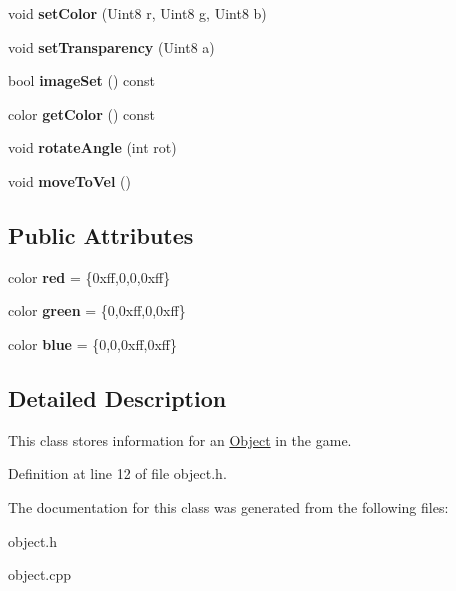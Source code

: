 \begin{DoxyCompactItemize}
\mbox{\label{classObject_a3edcc3118a41df3a46a096b23823f37e}} 
void {\bfseries set\+Color} (Uint8 r, Uint8 g, Uint8 b)
\item 
\mbox{\label{classObject_aa07a7c992ab59f6c1ee929e03fa2c2ea}} 
void {\bfseries set\+Transparency} (Uint8 a)
\item 
\mbox{\label{classObject_a249aa78f8e46de74ef3bc34461cec605}} 
bool {\bfseries image\+Set} () const
\item 
\mbox{\label{classObject_a62f952b12e33b13d3d7bbf09291aed47}} 
color {\bfseries get\+Color} () const
\item 
\mbox{\label{classObject_aea24881ca647d6ccf7d89fd2735c1969}} 
void {\bfseries rotate\+Angle} (int rot)
\item 
\mbox{\label{classObject_acb93016fa37730252cf35fa282e5a3c3}} 
void {\bfseries move\+To\+Vel} ()
\end{DoxyCompactItemize}
\subsection*{Public Attributes}
\begin{DoxyCompactItemize}
\item 
\mbox{\label{classObject_af614f0ca72ca572b74886552bb8aa19b}} 
color {\bfseries red} = \{0xff,0,0,0xff\}
\item 
\mbox{\label{classObject_a8f5119ace90c47b3d20d19b41027f85c}} 
color {\bfseries green} = \{0,0xff,0,0xff\}
\item 
\mbox{\label{classObject_a4bfc5def477cc3d742b571d65f043fa4}} 
color {\bfseries blue} = \{0,0,0xff,0xff\}
\end{DoxyCompactItemize}


\subsection{Detailed Description}
This class stores information for an \hyperlink{classObject}{Object} in the game. 

Definition at line 12 of file object.\+h.



The documentation for this class was generated from the following files\+:\begin{DoxyCompactItemize}
\item 
object.\+h\item 
object.\+cpp\end{DoxyCompactItemize}
